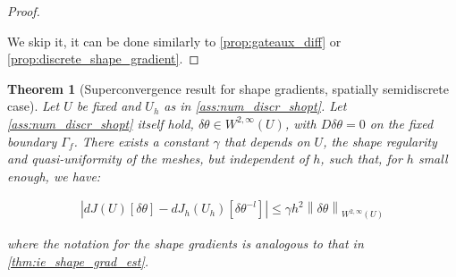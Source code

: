 \documentclass[english,a4paper,9pt,oneside]{scrbook}	%
\theoremstyle{break}
\newtheorem{thm}[equation]{Theorem}
\newenvironment{mproof}[1][\proofname]{%
  \begin{proof}[#1]$ $\par\nobreak\ignorespaces
}{%
  \end{proof}
}
\renewcommand*{\proofname}{Proof}
\theoremstyle{remark}
\newcommand{\norm}[1]{\left\lVert#1\right\rVert}
\newcommand{\te}{\theta}
\begin{document}
\begin{mproof}
We skip it, it can be done similarly to \cref{prop:gateaux_diff} or \cref{prop:discrete_shape_gradient}.
\end{mproof}

\begin{thm}[Superconvergence result for shape gradients, spatially semidiscrete case]
\label{thm:superconvergence_sd}
Let $U$ be fixed and $U_h$ as in \cref{ass:num_discr_shopt}. Let \cref{ass:num_discr_shopt} itself hold, $\delta \te \in W^{2,\infty}(U)$, with $D\delta \te=0$ on the fixed boundary $\Gamma_f$. There exists a constant $\gamma$ that depends on $U$, the shape regularity and quasi-uniformity of the meshes, but independent of $h$, such that, for $h$ small enough, we have:

\begin{align*}
	\left |dJ(U)[\delta \te] - dJ_h(U_h)[\delta \te^{-l}] \right|\leq \gamma  h^2 \norm{\delta \te}_{W^{2,\infty}(U)}
\end{align*}

where the notation for the shape gradients is analogous to that in \cref{thm:ie_shape_grad_est}.

\end{thm}
\end{document}
